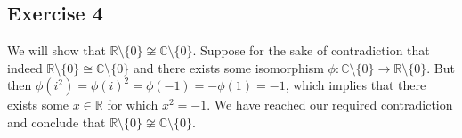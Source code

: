 \subsection*{Exercise 4}
We will show that $\mathbb{R}\setminus\{0\} \not\cong \mathbb{C}\setminus\{0\}$. Suppose for the sake of contradiction that indeed $\mathbb{R}\setminus\{0\} \cong \mathbb{C}\setminus\{0\}$ and there exists some isomorphism $\phi: \mathbb{C}\setminus\{0\} \rightarrow \mathbb{R}\setminus\{0\}$. But then $\phi(i^2) = \phi(i)^2 = \phi(-1) = -\phi(1) = -1$, which implies that there exists some $x \in \mathbb{R}$ for which $x^2 = -1$. We have reached our required contradiction and conclude that $\mathbb{R}\setminus\{0\} \not\cong \mathbb{C}\setminus\{0\}$.